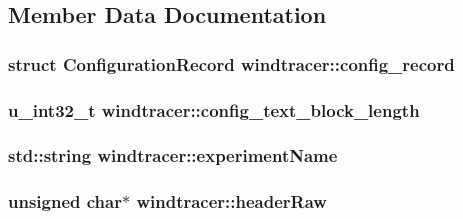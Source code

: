 \subsection{Member Data Documentation}
\hypertarget{classwindtracer_a5d67866d830f38f37ac8b0c69c6f7378}{
\subsubsection[{config\-\_\-record}]{\setlength{\rightskip}{0pt plus 5cm}struct {\bf Configuration\-Record} windtracer\-::config\-\_\-record\hspace{0.3cm}{\ttfamily [private]}}}\label{classwindtracer_a5d67866d830f38f37ac8b0c69c6f7378}
\hypertarget{classwindtracer_ade65f374d3b610d90658a3d0bbbf5111}{
\subsubsection[{config\-\_\-text\-\_\-block\-\_\-length}]{\setlength{\rightskip}{0pt plus 5cm}u\-\_\-int32\-\_\-t windtracer\-::config\-\_\-text\-\_\-block\-\_\-length\hspace{0.3cm}{\ttfamily [private]}}}\label{classwindtracer_ade65f374d3b610d90658a3d0bbbf5111}
\hypertarget{classwindtracer_aa0b5d56c9d831360a9a57b6652a9bce0}{
\subsubsection[{experiment\-Name}]{\setlength{\rightskip}{0pt plus 5cm}std\-::string windtracer\-::experiment\-Name\hspace{0.3cm}{\ttfamily [private]}}}\label{classwindtracer_aa0b5d56c9d831360a9a57b6652a9bce0}
\hypertarget{classwindtracer_a0fd43967f940c29d8977eb1240696d81}{
\subsubsection[{header\-Raw}]{\setlength{\rightskip}{0pt plus 5cm}unsigned char$\ast$ windtracer\-::header\-Raw\hspace{0.3cm}{\ttfamily [private]}}}\label{classwindtracer_a0fd43967f940c29d8977eb1240696d81}
